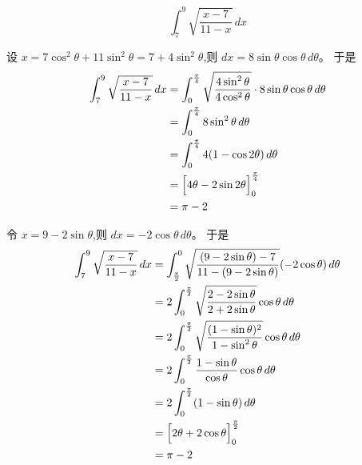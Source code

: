 \begin{questions}
    \question
    \[
    \int_{7}^{9} \sqrt{\frac{x-7}{11-x}} \, dx
    \]
    \begin{solution}
        设 $x = 7\cos^2 \theta + 11\sin^2 \theta = 7 + 4\sin^2 \theta$,则 $dx = 8\sin \theta \cos \theta \, d\theta$。
        于是
        \begin{align*}
        \int_{7}^{9} \sqrt{\frac{x-7}{11-x}} \, dx 
        &= \int_{0}^{\frac{\pi}{4}} \sqrt{\frac{4\sin^2 \theta}{4\cos^2 \theta}} \cdot 8\sin \theta \cos \theta \, d\theta \\
        &= \int_{0}^{\frac{\pi}{4}} 8\sin^2 \theta \, d\theta \\
        &= \int_{0}^{\frac{\pi}{4}} 4(1 - \cos 2\theta) \, d\theta \\
        &= \Bigl[4\theta - 2\sin 2\theta\Bigr]_{0}^{\frac{\pi}{4}} \\
        &= \pi - 2
        \end{align*}
    \end{solution}
    \begin{solution}
        令 $x = 9 - 2\sin \theta$,则 $dx = -2\cos \theta \, d\theta$。
        于是
        \begin{align*}
        \int_{7}^{9} \sqrt{\frac{x-7}{11-x}} \, dx  &= \int_{\frac{\pi}{2}}^{0} \sqrt{\frac{(9-2\sin \theta)-7}{11-(9-2\sin \theta)}} (-2\cos \theta) \, d\theta \\
        &= 2 \int_{0}^{\frac{\pi}{2}} \sqrt{\frac{2-2\sin \theta}{2+2\sin \theta}} \cos \theta \, d\theta \\
        &= 2 \int_{0}^{\frac{\pi}{2}} \sqrt{\frac{(1-\sin \theta)^2}{1-\sin^2 \theta}} \cos \theta \, d\theta \\
        &= 2 \int_{0}^{\frac{\pi}{2}} \frac{1-\sin \theta}{\cos \theta} \cos \theta \, d\theta \\
        &= 2 \int_{0}^{\frac{\pi}{2}} (1 - \sin \theta) \, d\theta \\
        &= \Bigl[2\theta + 2\cos \theta\Bigr]_{0}^{\frac{\pi}{2}} \\
        &= \pi - 2
        \end{align*}
    \end{solution}


\end{questions}
